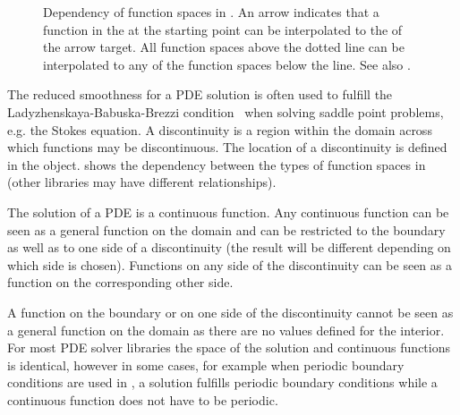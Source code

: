 \begin{figure}
\centering
{}
\caption{\label{ESCRIPT DEP}Dependency of function spaces in \finley.
An arrow indicates that a function in the \FunctionSpace at the starting point
can be interpolated to the \FunctionSpace of the arrow target.
All function spaces above the dotted line can be interpolated to any of
the function spaces below the line. See also .}
\end{figure}

The reduced smoothness for a PDE solution is often used to fulfill the
Ladyzhenskaya-Babuska-Brezzi condition~\cite{LBB} when solving saddle point
problems, e.g. the Stokes equation.
A discontinuity is a region within the domain across
which functions may be discontinuous.
The location of a discontinuity is defined in the \Domain object.
 shows the dependency between the types of function spaces
in \finley (other libraries may have different relationships).

The solution of a PDE is a continuous function. Any continuous function can
be seen as a general function on the domain and can be restricted to the
boundary as well as to one side of a discontinuity (the result will be
different depending on which side is chosen). Functions on any side of the
discontinuity can be seen as a function on the corresponding other side.

A function on the boundary or on one side of the discontinuity cannot be seen
as a general function on the domain as there are no values defined for the
interior. For most PDE solver libraries the space of the solution and
continuous functions is identical, however in some cases, for example when
periodic boundary conditions are used in \finley, a solution fulfills periodic
boundary conditions while a continuous function does not have to be periodic.

